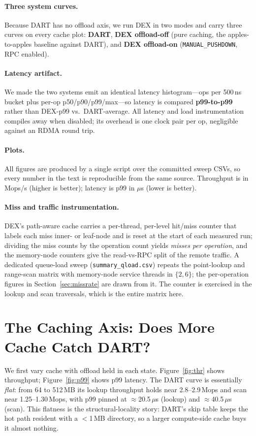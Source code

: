 \documentclass[sigconf,nonacm]{acmart}
\begin{document}
\paragraph{Three system curves.}
Because DART has no offload axis, we run DEX in two modes and carry three curves
on every cache plot: \textbf{DART}, \textbf{DEX offload-off} (pure caching, the
apples-to-apples baseline against DART), and \textbf{DEX offload-on}
(\texttt{MANUAL\_PUSHDOWN}, RPC enabled).

\paragraph{Latency artifact.}
We made the two systems emit an identical latency histogram---ops per 500\,ns
bucket plus per-op p50/p90/p99/max---so latency is compared \textbf{p99-to-p99}
rather than DEX-p99 vs.\ DART-average. All latency and load instrumentation
compiles away when disabled; its overhead is one clock pair per op, negligible
against an RDMA round trip.

\paragraph{Plots.}
All figures are produced by a single script over the committed sweep CSVs, so
every number in the text is reproducible from the same source. Throughput is in
Mops/s (higher is better); latency is p99 in $\mu$s (lower is better).

\paragraph{Miss and traffic instrumentation.}
DEX's path-aware cache carries a per-thread, per-level hit/miss counter that
labels each miss inner- or leaf-node and is reset at the start of each measured
run; dividing the miss counts by the operation count yields \emph{misses per
operation}, and the memory-node counters give the read-vs-RPC split of the remote
traffic. A dedicated queue-load sweep (\texttt{summary\_qload.csv}) repeats the
point-lookup and range-scan matrix with memory-node service threads in $\{2,6\}$;
the per-operation figures in Section~\ref{sec:missrate} are drawn from it. The
counter is exercised in the lookup and scan traversals, which is the entire matrix
here.

\section{The Caching Axis: Does More Cache Catch DART?}
\label{sec:cache}
We first vary cache with offload held in each state.
Figure~\ref{fig:thr} shows throughput; Figure~\ref{fig:p99} shows p99 latency.
The DART curve is essentially \emph{flat}: from 64 to 512\,MB its lookup
throughput holds near 2.8--2.9\,Mops and scan near 1.25--1.30\,Mops, with p99
pinned at $\approx$20.5\,$\mu$s (lookup) and $\approx$40.5\,$\mu$s (scan). This
flatness is the structural-locality story: DART's skip table keeps the hot path
resident with a $<$1\,MB directory, so a larger compute-side cache buys it almost
nothing.
\end{document}
